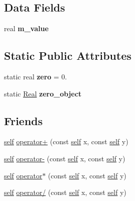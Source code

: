 \subsection*{Data Fields}
\begin{DoxyCompactItemize}
\item 
\mbox{\label{classez_1_1objects_1_1Real_a938100ccdb8b23c08343ecf57b15e465}} 
real {\bfseries m\+\_\+value}
\end{DoxyCompactItemize}
\subsection*{Static Public Attributes}
\begin{DoxyCompactItemize}
\item 
\mbox{\label{classez_1_1objects_1_1Real_af773ca8566f80f88252849967308622a}} 
static real {\bfseries zero} = 0.
\item 
\mbox{\label{classez_1_1objects_1_1Real_a6083b037e9aa91368cf1df3f9a28f6d5}} 
static \hyperlink{classez_1_1objects_1_1Real}{Real} {\bfseries zero\+\_\+object}
\end{DoxyCompactItemize}
\subsection*{Friends}
\begin{DoxyCompactItemize}
\item 
\hyperlink{classez_1_1objects_1_1Real}{self} \hyperlink{classez_1_1objects_1_1Real_ac219ecb06730e7707b9bb78b5da63c3b}{operator+} (const \hyperlink{classez_1_1objects_1_1Real}{self} x, const \hyperlink{classez_1_1objects_1_1Real}{self} y)
\item 
\hyperlink{classez_1_1objects_1_1Real}{self} \hyperlink{classez_1_1objects_1_1Real_a6750cba02a1d652b1bd892bfba555e50}{operator-\/} (const \hyperlink{classez_1_1objects_1_1Real}{self} x, const \hyperlink{classez_1_1objects_1_1Real}{self} y)
\item 
\hyperlink{classez_1_1objects_1_1Real}{self} \hyperlink{classez_1_1objects_1_1Real_a4f9af882c7a074ed8e1f8da41bd31dc9}{operator$\ast$} (const \hyperlink{classez_1_1objects_1_1Real}{self} x, const \hyperlink{classez_1_1objects_1_1Real}{self} y)
\item 
\hyperlink{classez_1_1objects_1_1Real}{self} \hyperlink{classez_1_1objects_1_1Real_aa69c5e8b6898bb99a6f4d6e8962560c8}{operator/} (const \hyperlink{classez_1_1objects_1_1Real}{self} x, const \hyperlink{classez_1_1objects_1_1Real}{self} y)
\end{DoxyCompactItemize}


